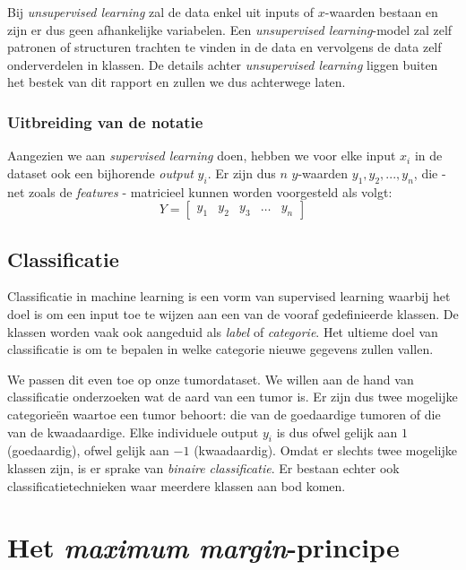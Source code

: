 \documentclass[twoside, kulak]{kulakreport}
\begin{document}
	Bij \textit{unsupervised learning} zal de data enkel uit inputs of \(x\)-waarden bestaan en zijn er dus geen afhankelijke variabelen. Een \textit{unsupervised learning}-model zal zelf patronen of structuren trachten te vinden in de data en vervolgens de data zelf onderverdelen in klassen. De details achter \emph{unsupervised learning} liggen buiten het bestek van dit rapport en zullen we dus achterwege laten.
	
	\subsection{Uitbreiding van de notatie}

	Aangezien we aan \textit{supervised learning} doen, hebben we voor elke input \(x_i\) in de dataset ook een bijhorende \textit{output} \(y_i\). Er zijn dus \(n\) \(y\)-waarden \(y_1,y_2,...,y_n\), die - net zoals de \textit{features} - matricieel kunnen worden voorgesteld als volgt: \[Y =  \left[ \begin{array}{ccccc} y_1 & y_2 & y_3 & \ldots & y_n \end{array} \right]\]
	
	\section{Classificatie}
	
	Classificatie in machine learning is een vorm van supervised learning waarbij het doel is om een input toe te wijzen aan een van de vooraf gedefinieerde klassen. De klassen worden vaak ook aangeduid als \textit{label} of \textit{categorie}. Het ultieme doel van classificatie is om te bepalen in welke categorie nieuwe gegevens zullen vallen.
	
	We passen dit even toe op onze tumordataset. We willen aan de hand van classificatie onderzoeken wat de aard van een tumor is. Er zijn dus twee mogelijke categorieën waartoe een tumor behoort: die van de goedaardige tumoren of die van de kwaadaardige. Elke individuele output \(y_i\) is dus ofwel gelijk aan \(1\) (goedaardig), ofwel gelijk aan \(-1\) (kwaadaardig). Omdat er slechts twee mogelijke klassen zijn, is er sprake van \textit{binaire classificatie}. Er bestaan echter ook classificatietechnieken waar meerdere klassen aan bod komen.
	
	\chapter{Het \textit{maximum margin}-principe}
	
\end{document}
